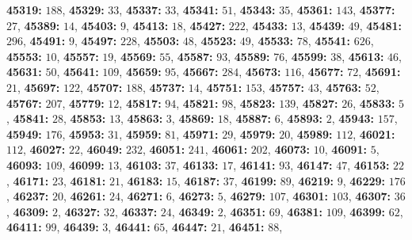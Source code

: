 \textsf{\bfseries 45319:} $188$, \textsf{\bfseries 45329:} $33$, \textsf{\bfseries 45337:} $33$, \textsf{\bfseries 45341:} $51$, \textsf{\bfseries 45343:} $35$, \textsf{\bfseries 45361:} $143$, \textsf{\bfseries 45377:} $27$, \textsf{\bfseries 45389:} $14$, \textsf{\bfseries 45403:} $9$, \textsf{\bfseries 45413:} $18$, \textsf{\bfseries 45427:} $222$, \textsf{\bfseries 45433:} $13$, \textsf{\bfseries 45439:} $49$, \textsf{\bfseries 45481:} $296$, \textsf{\bfseries 45491:} $9$, \textsf{\bfseries 45497:} $228$, \textsf{\bfseries 45503:} $48$, \textsf{\bfseries 45523:} $49$, \textsf{\bfseries 45533:} $78$, \textsf{\bfseries 45541:} $626$, \textsf{\bfseries 45553:} $10$, \textsf{\bfseries 45557:} $19$, \textsf{\bfseries 45569:} $55$, \textsf{\bfseries 45587:} $93$, \textsf{\bfseries 45589:} $76$, \textsf{\bfseries 45599:} $38$, \textsf{\bfseries 45613:} $46$, \textsf{\bfseries 45631:} $50$, \textsf{\bfseries 45641:} $109$, \textsf{\bfseries 45659:} $95$, \textsf{\bfseries 45667:} $284$, \textsf{\bfseries 45673:} $116$, \textsf{\bfseries 45677:} $72$, \textsf{\bfseries 45691:} $21$, \textsf{\bfseries 45697:} $122$, \textsf{\bfseries 45707:} $188$, \textsf{\bfseries 45737:} $14$, \textsf{\bfseries 45751:} $153$, \textsf{\bfseries 45757:} $43$, \textsf{\bfseries 45763:} $52$, \textsf{\bfseries 45767:} $207$, \textsf{\bfseries 45779:} $12$, \textsf{\bfseries 45817:} $94$, \textsf{\bfseries 45821:} $98$, \textsf{\bfseries 45823:} $139$, \textsf{\bfseries 45827:} $26$, \textsf{\bfseries 45833:} $5$, \textsf{\bfseries 45841:} $28$, \textsf{\bfseries 45853:} $13$, \textsf{\bfseries 45863:} $3$, \textsf{\bfseries 45869:} $18$, \textsf{\bfseries 45887:} $6$, \textsf{\bfseries 45893:} $2$, \textsf{\bfseries 45943:} $157$, \textsf{\bfseries 45949:} $176$, \textsf{\bfseries 45953:} $31$, \textsf{\bfseries 45959:} $81$, \textsf{\bfseries 45971:} $29$, \textsf{\bfseries 45979:} $20$, \textsf{\bfseries 45989:} $112$, \textsf{\bfseries 46021:} $112$, \textsf{\bfseries 46027:} $22$, \textsf{\bfseries 46049:} $232$, \textsf{\bfseries 46051:} $241$, \textsf{\bfseries 46061:} $202$, \textsf{\bfseries 46073:} $10$, \textsf{\bfseries 46091:} $5$, \textsf{\bfseries 46093:} $109$, \textsf{\bfseries 46099:} $13$, \textsf{\bfseries 46103:} $37$, \textsf{\bfseries 46133:} $17$, \textsf{\bfseries 46141:} $93$, \textsf{\bfseries 46147:} $47$, \textsf{\bfseries 46153:} $22$, \textsf{\bfseries 46171:} $23$, \textsf{\bfseries 46181:} $21$, \textsf{\bfseries 46183:} $15$, \textsf{\bfseries 46187:} $37$, \textsf{\bfseries 46199:} $89$, \textsf{\bfseries 46219:} $9$, \textsf{\bfseries 46229:} $176$, \textsf{\bfseries 46237:} $20$, \textsf{\bfseries 46261:} $24$, \textsf{\bfseries 46271:} $6$, \textsf{\bfseries 46273:} $5$, \textsf{\bfseries 46279:} $107$, \textsf{\bfseries 46301:} $103$, \textsf{\bfseries 46307:} $36$, \textsf{\bfseries 46309:} $2$, \textsf{\bfseries 46327:} $32$, \textsf{\bfseries 46337:} $24$, \textsf{\bfseries 46349:} $2$, \textsf{\bfseries 46351:} $69$, \textsf{\bfseries 46381:} $109$, \textsf{\bfseries 46399:} $62$, \textsf{\bfseries 46411:} $99$, \textsf{\bfseries 46439:} $3$, \textsf{\bfseries 46441:} $65$, \textsf{\bfseries 46447:} $21$, \textsf{\bfseries 46451:} $88$, 

